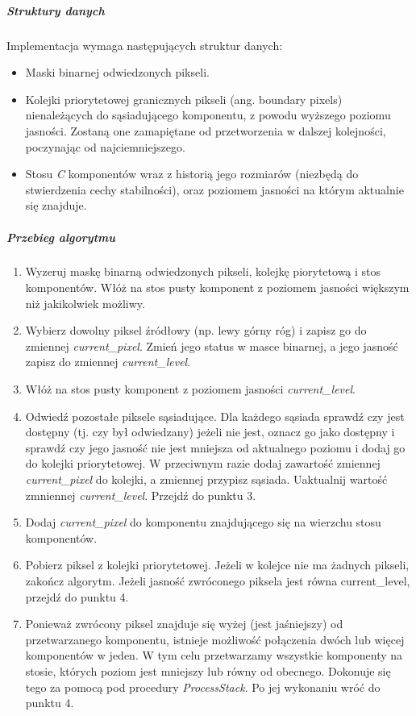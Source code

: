 \subparagraph{Struktury danych}

Implementacja wymaga następujących struktur danych: 
\begin{itemize} \item Maski binarnej odwiedzonych pikseli.  \item Kolejki
    priorytetowej granicznych pikseli (ang. boundary pixels) nienależących do
    sąsiadującego komponentu, z powodu wyższego poziomu jasności. Zostaną one
    zamapiętane od przetworzenia w dalszej kolejności, poczynając od
    najciemniejszego.  \item Stosu \textit{C} komponentów wraz z historią jego
    rozmiarów (niezbędą do stwierdzenia cechy stabilności), oraz poziomem
    jasności na którym aktualnie się znajduje.  \end{itemize}

\subparagraph{Przebieg algorytmu}

\begin{enumerate} \item Wyzeruj maskę binarną odwiedzonych pikseli, kolejkę
piorytetową i stos komponentów. Włóż na stos pusty komponent z poziomem
jasności większym niż jakikolwiek możliwy. \item Wybierz dowolny piksel
źródłowy (np. lewy górny róg) i zapisz go do zmiennej \textit{current\_pixel}.
Zmień jego status w masce binarnej, a jego jasność zapisz do zmiennej
\textit{current\_level}. \item Włóż na stos pusty komponent z poziomem jasności
\textit{current\_level}. \item Odwiedź pozostałe piksele sąsiadujące. Dla
każdego sąsiada sprawdź czy jest dostępny (tj. czy był odwiedzany) jeżeli nie
jest, oznacz go jako dostępny i sprawdź czy jego jasność nie jest mniejsza od
aktualnego poziomu i dodaj go do kolejki priorytetowej. W przeciwnym razie
dodaj zawartość zmiennej \textit{current\_pixel} do kolejki, a zmiennej
przypisz sąsiada. Uaktualnij wartość zmniennej \textit{current\_level}. Przejdź
do punktu 3. \item Dodaj \textit{current\_pixel} do komponentu znajdującego się
na wierzchu stosu komponentów. \item Pobierz piksel z kolejki priorytetowej.
Jeżeli w kolejce nie ma żadnych pikseli, zakończ algorytm. Jeżeli jasność
zwróconego piksela jest równa current\_level, przejdź do punktu 4. \item
Ponieważ zwrócony piksel znajduje się wyżej (jest jaśniejszy) od
przetwarzanego komponentu, istnieje możliwość połączenia dwóch lub więcej
komponentów w jeden. W tym celu przetwarzamy wszystkie komponenty na stosie,
których poziom jest mniejszy lub równy od obecnego. Dokonuje się tego za pomocą
pod procedury \textit{ProcessStack}. Po jej wykonaniu wróć do punktu 4. \end{enumerate}

